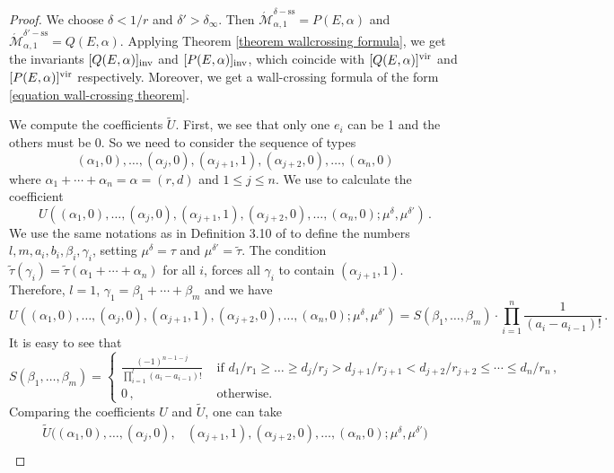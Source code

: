 \documentclass[11pt]{amsart}
\theoremstyle{remark}
\newcommand{\Mdash}{\acute{\mathcal{M}}}
\newcommand{\vir}[0]{\textnormal{vir}}
\newcommand{\inv}[0]{\textnormal{inv}}
\renewcommand{\ss}[0]{\text{ss}}
\numberwithin{theorem}{section}
\begin{document}
    \begin{proof}
    We choose $\delta< 1/r$ and $\delta' > \delta_\infty$.
    Then
    $\Mdash_{\alpha,1}^{\delta-\ss} = P(E,\alpha)$
    and $\Mdash_{\alpha,1}^{\delta'-\ss}= Q(E,\alpha)$.
    Applying Theorem \ref{theorem wallcrossing formula}, we get the invariants $[Q(E,\alpha)]_\inv$ and $[P(E,\alpha)]_\inv$,
    which coincide with $[Q(E,\alpha)]^\vir$ and $[P(E,\alpha)]^\vir$ respectively.
    Moreover, we get a wall-crossing formula of the form \eqref{equation wall-crossing theorem}.
    
    We compute the coefficients $\tilde U$. 
    First, we see that only one $e_i$ can be 1 and the others must be 0.
    So we need to consider the sequence of types
    $$(\alpha_1,0), \dots, (\alpha_j,0), (\alpha_{j+1},1), (\alpha_{j+2},0),\dots,(\alpha_n,0)$$
    where $\alpha_1 + \cdots + \alpha_n = \alpha = (r,d)$
    and $1 \leqslant j \leqslant n$.
    We use \cite[Definition 3.10]{Joy21} to calculate the coefficient
    $$U((\alpha_1,0), \dots, (\alpha_j,0), (\alpha_{j+1},1),(\alpha_{j+2},0),\dots,(\alpha_n,0); \mu^\delta,\mu^{\delta'})\,.$$
    We use the same notations as in Definition 3.10 of \cite{Joy21}
    to define the numbers $l,m,a_i,b_i,\beta_i,\gamma_i$, 
    setting $\mu^\delta = \tau$ and $\mu^{\delta'}=\tilde{\tau}$.
    The condition $\tilde{\tau}(\gamma_i)= \tilde{\tau}(\alpha_1 + \cdots + \alpha_n)$ for all $i$, forces all $\gamma_i$ to contain $(\alpha_{j+1},1)$. 
    Therefore, $l=1$, $\gamma_1 = \beta_1 +\cdots + \beta_m$ and we have
    $$U((\alpha_1,0), \dots, (\alpha_j,0), (\alpha_{j+1},1),(\alpha_{j+2},0),\dots,(\alpha_n,0); \mu^\delta,\mu^{\delta'}) = 
    S(\beta_1,\dots,\beta_m) \cdot \prod_{i=1}^n \frac{1}{(a_i-a_{i-1})!} \,.$$
    It is easy to see that
    $$ S(\beta_1,\dots,\beta_m) = 
    \begin{cases}
        \frac{(-1)^{n-1-j}}{\prod_{i=1}^l(a_i-a_{i-1})!}
        & \text{ if } d_1/r_1 \geqslant \dots \geqslant d_j/r_j > d_{j+1}/r_{j+1} < d_{j+2}/r_{j+2} \leqslant \cdots \leqslant d_n/r_n\, ,\\
        0 \, , &\text{ otherwise.}
    \end{cases}$$
    Comparing the coefficients $U$ and $\tilde U$, one can take
    \begin{align*}
        \tilde{U}((\alpha_1,0), \dots, (\alpha_j,0), & (\alpha_{j+1},1),(\alpha_{j+2},0),\dots,(\alpha_n,0); \mu^\delta,\mu^{\delta'}) \\

\end{align*}
\end{proof}
\end{document}

